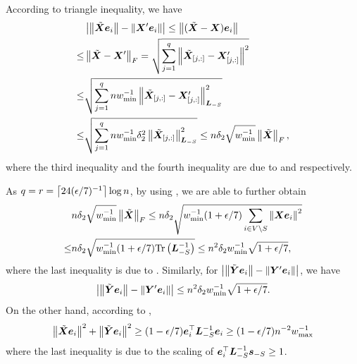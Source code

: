 \documentclass[journal]{IEEEtran}
\begin{document}
\begin{IEEEproof}
    According to triangle inequality, we have
    \begin{align*}
            & \left|\left\Vert\tilde{\boldsymbol{X}}\boldsymbol{e}_i\right\Vert-\left\Vert\boldsymbol{X}'\boldsymbol{e}_i\right\Vert \right|\le\left\Vert(\tilde{\boldsymbol{X}}-\boldsymbol{X})\boldsymbol{e}_i\right\Vert                                                   \\
        \le & \left\Vert\tilde{\boldsymbol{X}}-\boldsymbol{X}'\right\Vert_{F}= \sqrt{\sum_{j=1}^q\left\Vert\tilde{\boldsymbol{X}}_{[j,:]}-\boldsymbol{X}'_{[j,:]}\right\Vert^2}                                             \\
        \le & \sqrt{\sum_{j=1}^qnw_{\min}^{-1}\left\Vert\tilde{\boldsymbol{X}}_{[j,:]}-\boldsymbol{X}'_{[j,:]}\right\Vert_{\boldsymbol{L}_{-S}}^2}                                                   \\
        \le & \sqrt{\sum_{j=1}^qnw_{\min}^{-1}\delta_2^2\left\Vert\tilde{\boldsymbol{X}}_{[j,:]}\right\Vert_{\boldsymbol{L}_{-S}}^2}\le n\delta_2\sqrt{w_{\min}^{-1}}\left\Vert\tilde{\boldsymbol{X}}\right\Vert_F,
    \end{align*}
    where the third inequality and the fourth inequality are due to  and  respectively.

    As \(q=r=\left\lceil24(\epsilon/7)^{-1}\right\rceil\log n\), by using , we are able to further obtain
    \begin{align*}
            & n\delta_2\sqrt{w_{\min}^{-1}}\left\Vert\tilde{\boldsymbol{X}}\right\Vert_F\le n\delta_2\sqrt{w_{\min}^{-1}(1+\epsilon/7)\sum_{i\in V\setminus S}\left\Vert\boldsymbol{X}\boldsymbol{e}_i\right\Vert^2} \\
        \le & n\delta_2\sqrt{w_{\min}^{-1}(1+\epsilon/7)\mathrm{Tr}\left(\boldsymbol{L}_{-S}^{-1}\right)}\le n^2\delta_2w_{\min}^{-1}\sqrt{1+\epsilon/7},
    \end{align*}
    where the last inequality is due to .
    Similarly, for \(\left|\left\Vert\tilde{\boldsymbol{Y}}\boldsymbol{e}_i\right\Vert-\left\Vert\boldsymbol{Y}'\boldsymbol{e}_i\right\Vert \right|\), we have
    \begin{equation}\label{eq:approx-maty-raw}
        \left|\left\Vert\tilde{\boldsymbol{Y}}\boldsymbol{e}_i\right\Vert-\left\Vert\boldsymbol{Y}'\boldsymbol{e}_i\right\Vert \right|\le n^2\delta_2w_{\min}^{-1}\sqrt{1+\epsilon/7}.
    \end{equation}
    On the other hand, according to ,
    \[\left\Vert\tilde{\boldsymbol{X}}\boldsymbol{e}_i\right\Vert^2+\left\Vert\tilde{\boldsymbol{Y}}\boldsymbol{e}_i\right\Vert^2\ge(1-\epsilon/7)\boldsymbol{e}_i^\top\boldsymbol{L}_{-S}^{-1}\boldsymbol{e}_i\ge(1-\epsilon/7)n^{-2}w_{\max}^{-1}\]
    where the last inequality is due to the scaling of \(\boldsymbol{e}_i^\top\boldsymbol{L}_{-S}^{-1}\boldsymbol{s}_{-S}\ge1\).


\end{IEEEproof}
\end{document}
